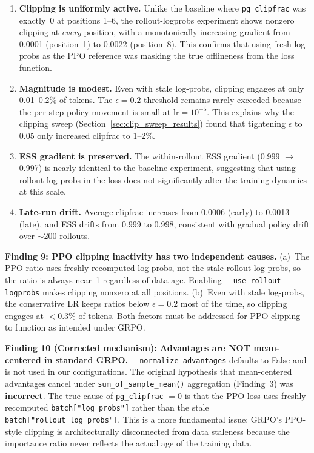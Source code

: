 \documentclass[11pt,a4paper]{article}
\begin{document}
\begin{enumerate}[leftmargin=*]
  \item \textbf{Clipping is uniformly active.} Unlike the baseline where
    \texttt{pg\_clipfrac} was exactly~0 at positions 1--6, the rollout-logprobs
    experiment shows nonzero clipping at \emph{every} position, with a
    monotonically increasing gradient from 0.0001 (position~1) to 0.0022
    (position~8). This confirms that using fresh log-probs as the PPO reference
    was masking the true offlineness from the loss function.

  \item \textbf{Magnitude is modest.} Even with stale log-probs, clipping
    engages at only 0.01--0.2\% of tokens. The $\epsilon = 0.2$ threshold
    remains rarely exceeded because the per-step policy movement is small at
    $\mathrm{lr} = 10^{-5}$. This explains why the clipping sweep
    (Section~\ref{sec:clip_sweep_results}) found that tightening
    $\epsilon$ to 0.05 only increased clipfrac to 1--2\%.

  \item \textbf{ESS gradient is preserved.} The within-rollout ESS gradient
    (0.999 $\to$ 0.997) is nearly identical to the baseline experiment,
    suggesting that using rollout log-probs in the loss does not
    significantly alter the training dynamics at this scale.

  \item \textbf{Late-run drift.} Average clipfrac increases from 0.0006
    (early) to 0.0013 (late), and ESS drifts from 0.999 to 0.998, consistent
    with gradual policy drift over $\sim$200 rollouts.
\end{enumerate}

\begin{keyinsight}
\textbf{Finding 9: PPO clipping inactivity has two independent causes.}
(a)~The PPO ratio uses freshly recomputed log-probs, not the stale rollout
log-probs, so the ratio is always near~1 regardless of data age. Enabling
\texttt{-{}-use-rollout-logprobs} makes clipping nonzero at all positions.
(b)~Even with stale log-probs, the conservative LR keeps ratios below
$\epsilon = 0.2$ most of the time, so clipping engages at $<$0.3\% of tokens.
Both factors must be addressed for PPO clipping to function as intended under
GRPO.
\end{keyinsight}

\begin{keyinsight}
\textbf{Finding 10 (Corrected mechanism): Advantages are NOT mean-centered in
standard GRPO.} \texttt{-{}-normalize-advantages} defaults to False and is not
used in our configurations. The original hypothesis that mean-centered
advantages cancel under \texttt{sum\_of\_sample\_mean()} aggregation (Finding~3)
was \textbf{incorrect}. The true cause of \texttt{pg\_clipfrac} $= 0$ is that
the PPO loss uses freshly recomputed \texttt{batch["log\_probs"]} rather than
the stale \texttt{batch["rollout\_log\_probs"]}. This is a more fundamental
issue: GRPO's PPO-style clipping is architecturally disconnected from data
staleness because the importance ratio never reflects the actual age of the
training data.
\end{keyinsight}
\end{document}
